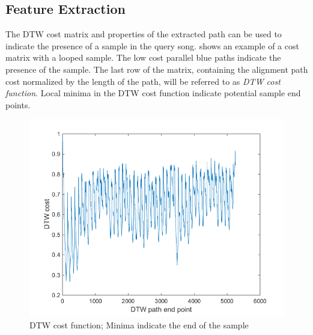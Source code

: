 \documentclass{article}
\begin{document}
\subsection{Feature Extraction}
The DTW cost matrix and properties of the extracted path can be used to indicate the presence of a sample in the query song.  shows an example of a cost matrix with a looped sample. The low cost parallel blue paths indicate the presence of the sample. The last row of the matrix, containing the alignment path cost normalized by the length of the path, will be referred to as \textit{DTW cost function}. Local minima in the DTW cost function indicate potential sample end points.

\begin{figure}[t]
\centering
\includegraphics[width=\linewidth]{DTWcost.png}
\caption{DTW cost function; Minima indicate the end of the sample}
\label{fig3}
\end{figure}
\end{document}
